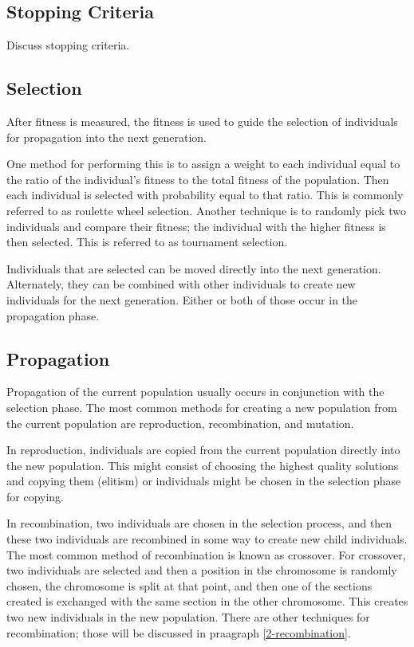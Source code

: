 \subsection{Stopping Criteria}

Discuss stopping criteria.

\subsection{Selection}

After fitness is measured, the fitness is used to guide the selection of
individuals for propagation into the next generation. 

One method for performing this is to assign a weight to each individual
equal to the ratio of the individual's fitness to the total fitness of the
population. Then each individual is selected with probability equal to that
ratio. This is commonly referred to as roulette wheel selection. Another
technique is to randomly pick two individuals and compare their fitness; the
individual with the higher fitness is then selected. This is referred to as
tournament selection. 

Individuals that are selected can be moved directly into the next generation.
Alternately, they can be combined with other individuals to create new
individuals for the next generation. Either or both of those occur in the
propagation phase.

\subsection{Propagation}

Propagation of the current population usually occurs in conjunction with the
selection phase. The most common methods for creating a new population from the
current population are reproduction, recombination, and mutation.

In reproduction, individuals are copied from the current population directly
into the new population. This might consist of choosing the highest quality
solutions and copying them (elitism) or individuals might be chosen in the
selection phase for copying.

In recombination, two individuals are chosen in the selection process, and then
these two individuals are recombined in some way to create new child
individuals. The most common method of recombination is known as crossover. For
crossover, two individuals are selected and then a position in the chromosome is
randomly chosen, the chromosome is split at that point, and then one of the
sections created is exchanged with the same section in the other chromosome.
This creates two new individuals in the new population. There are other
techniques for recombination; those will be discussed in praagraph
\ref{2-recombination}.


